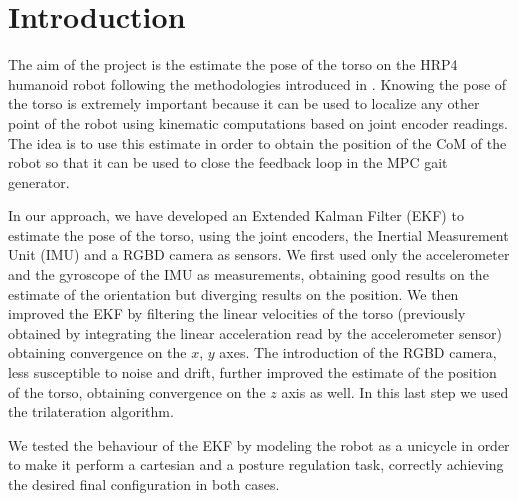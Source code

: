 \documentclass[a4paper]{article}
\begin{document}
\tableofcontents
\newpage



\section{Introduction}

The aim of the project is the estimate the pose of the torso on the HRP4
humanoid robot following the methodologies introduced in
\cite{DBLP:journals/arobots/OrioloPRV16}. Knowing the pose of the torso is
extremely important because it can be used to localize any other point of
the robot using kinematic computations based on joint encoder readings.
The idea is to use this estimate in order to obtain the position of the CoM %
of the robot so that it can be used to close the feedback loop in the
MPC gait generator.

In our approach, we have developed an Extended Kalman Filter (EKF) to estimate
the pose of the torso, using
the joint encoders, the Inertial Measurement Unit (IMU) and a RGBD camera
as sensors. We first used only the accelerometer and the gyroscope of the IMU
as measurements, obtaining good results on the estimate of the orientation but
diverging results on the position. We then improved the EKF by filtering the
linear velocities of the torso (previously obtained by integrating the linear
acceleration read by the accelerometer sensor) obtaining convergence on the
$x$, $y$ axes. The introduction of the
RGBD camera, less susceptible to noise and drift, further improved the
estimate of the position of the torso, obtaining convergence on the $z$
axis as well. In this last step we used the trilateration algorithm.

We tested the behaviour of the EKF by modeling the robot as a unicycle
in order to make it perform a cartesian and a posture regulation task,
correctly achieving the desired final configuration in both cases.
\end{document}
